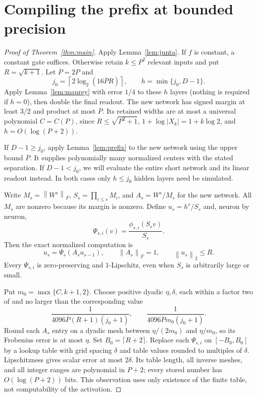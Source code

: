 \documentclass[11pt]{article}
\theoremstyle{remark}
\newcommand{\norm}[1]{\left\lVert #1\right\rVert}
\begin{document}
\section{Compiling the prefix at bounded precision}
\label{sec:compiler}

\begin{proof}[Proof of Theorem~\ref{thm:main}]
Apply Lemma~\ref{lem:junta}. If $f$ is constant, a constant gate
suffices. Otherwise retain $k\le P^2$ relevant inputs and put
$R=\sqrt{k+1}$. Let $\overline P=2P$ and
\[
 j_0=\left\lceil2\log_2(16\overline P R)\right\rceil,
 \qquad h=\min\{j_0,D-1\}.
\]
Apply Lemma~\ref{lem:maurey} with error $1/4$ to these $h$ layers
(nothing is required if $h=0$), then double the final readout. The new
network has signed margin at least $3/2$ and product at most
$\overline P$. Its retained widths are at most a universal polynomial
$C=C(P)$, since $R\le\sqrt{P^2+1}$,
$1+\log|X_k|=1+k\log2$, and $h=O(\log(P+2))$.

If $D-1\ge j_0$, apply Lemma~\ref{lem:prefix} to the new network
using the upper bound $\overline P$. It supplies polynomially many
normalized centers with the stated separation. If $D-1<j_0$, we will
evaluate the entire short network and its linear readout instead.
In both cases only $h\le j_0$ hidden layers need be simulated.

Write $M_s=\norm{W^s}_F$, $S_s=\prod_{i\le s}M_i$, and
$A_s=W^s/M_s$ for the new network. All $M_s$ are nonzero because its
margin is nonzero. Define $u_s=h^s/S_s$ and, neuron by neuron,
\[
 \Psi_{s,i}(v)=\frac{\phi_{s,i}(S_s v)}{S_s}.
\]
Then the exact normalized computation is
\[
 u_s=\Psi_s(A_su_{s-1}),\qquad
 \norm{A_s}_F=1,\qquad \norm{u_s}_2\le R.
\]
Every $\Psi_{s,i}$ is zero-preserving and $1$-Lipschitz, even when
$S_s$ is arbitrarily large or small.

Put $m_0=\max\{C,k+1,2\}$. Choose positive dyadic $\eta,\delta$,
each within a factor two of and no larger than the corresponding value
\[
 \frac1{4096\overline P(R+1)(j_0+1)},\qquad
 \frac1{4096\overline P m_0(j_0+1)}.
\]
Round each $A_s$ entry on a dyadic mesh between
$\eta/(2m_0)$ and $\eta/m_0$, so its Frobenius error is at most
$\eta$. Set $B_0=\lceil R+2\rceil$. Replace each $\Psi_{s,i}$ on
$[-B_0,B_0]$ by a lookup table with grid spacing $\delta$ and table
values rounded to multiples of $\delta$. Lipschitzness gives scalar
error at most $2\delta$. Its table length, all inverse meshes, and all
integer ranges are polynomial in $P+2$; every stored number has
$O(\log(P+2))$ bits. This observation uses only existence of the finite
table, not computability of the activation.


\end{proof}
\end{document}
